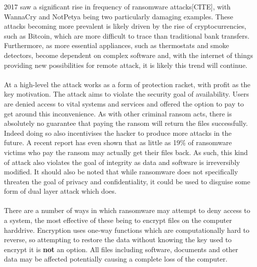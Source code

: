 \documentclass{article}
\begin{document}
2017 saw a significant rise in frequency of ransomware attacks[CITE], with WannaCry\cite{wannacry_reuters, wannacry_bbc} and NotPetya\cite{petya_independent} being two particularly damaging examples.
These attacks becoming more prevalent is likely driven by the rise of cryptocurrencies, such as Bitcoin, which are more difficult to trace than traditional bank transfers.
Furthermore, as more essential appliances, such as thermostats and smoke detectors, become dependent on complex software and, with the internet of things providing new possibilities for remote attack, it is likely this trend will continue.
\\\\%
At a high-level the attack works as a form of protection racket, with profit as the key motivation\cite{mcafee_2018}.
The attack aims to violate the security goal of availability.
Users are denied access to vital systems and services and offered the option to pay to get around this inconvenience. As with other criminal ransom acts, there is absolutely no guarantee that paying the ransom will return the files successfully\cite{ncsc_mitigating_malware}. 
Indeed doing so also incentivises the hacker to produce more attacks in the future.
A recent report has even shown that as little as 19\% of ransomware victims who pay the ransom may actually get their files back\cite{cyberedge_group, forbes_cyberedge}. As such, this kind of attack also violates the goal of integrity as data and software is irreversibly modified.
It should also be noted that while ransomware does not specifically threaten the goal of privacy and confidentiality, it could be used to disguise some form of dual layer attack which does.
\\\\%
There are a number of ways in which ransomware may attempt to deny access to a system, the most effective of these being to encrypt files on the computer harddrive. 
Encryption uses one-way functions which are computationally hard to reverse, so attempting to restore the data without knowing the key used to encrypt it is \textbf{not} an option.
All files including software, documents and other data may be affected potentially causing a complete loss of the computer.
\end{document}
